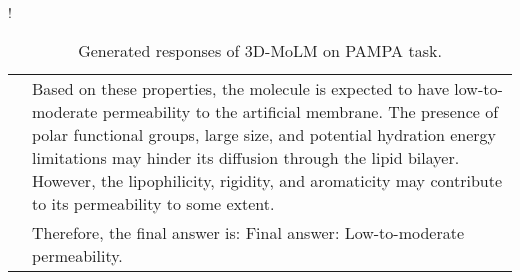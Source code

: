 \begin{table}[ht!]
\begin{resizebox}{\linewidth}{!}
{\begin{tabular}{p{1.2cm} p{18cm}}
& Based on these properties, the molecule is expected to have low-to-moderate permeability to the artificial membrane. The presence of polar functional groups, large size, and potential hydration energy limitations may hinder its diffusion through the lipid bilayer. However, the lipophilicity, rigidity, and aromaticity may contribute to its permeability to some extent.  \\

& Therefore, the final answer is: Final answer: Low-to-moderate permeability.\\
\bottomrule
\end{tabular}}
\end{resizebox}
\vspace{-0.1in}
\caption{Generated responses of 3D-MoLM on PAMPA task.}
\label{app:tab:pampa_3DMoLM}
\end{table}
